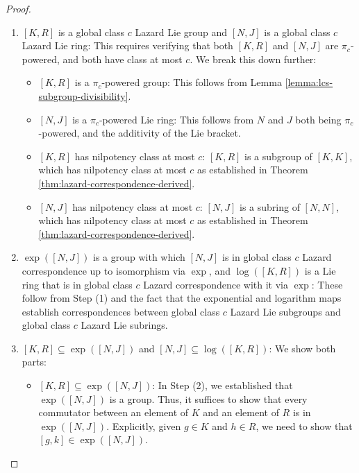 \documentclass{ucetd}
\begin{document}
\begin{proof}
  \begin{enumerate}
  \item $[K,R]$ is a global class $c$ Lazard Lie group and $[N,J]$ is a
    global class $c$ Lazard Lie ring: This requires verifying that
    both $[K,R]$ and $[N,J]$ are $\pi_c$-powered, and both have class
    at most $c$. We break this down further:

    \begin{itemize}
    \item $[K,R]$ is a $\pi_c$-powered group: This follows from Lemma
      \ref{lemma:lcs-subgroup-divisibility}.
    \item $[N,J]$ is a $\pi_c$-powered Lie ring: This follows from $N$
      and $J$ both being $\pi_c$-powered, and the additivity of the
      Lie bracket.
    \item $[K,R]$ has nilpotency class at most $c$: $[K,R]$ is a
      subgroup of $[K,K]$, which has nilpotency class at most $c$ as
      established in Theorem \ref{thm:lazard-correspondence-derived}.
    \item $[N,J]$ has nilpotency class at most $c$: $[N,J]$ is a
      subring of $[N,N]$, which has nilpotency class at most $c$ as
      established in Theorem \ref{thm:lazard-correspondence-derived}.
    \end{itemize}

  \item $\exp([N,J])$ is a group with which $[N,J]$ is in global
    class $c$ Lazard correspondence up to isomorphism via $\exp$, and
    $\log([K,R])$ is a Lie ring that is in global class $c$ Lazard
    correspondence with it via $\exp$: These follow from Step (1) and
    the fact that the exponential and logarithm maps establish
    correspondences between global class $c$ Lazard Lie subgroups and
    global class $c$ Lazard Lie subrings.

  \item $[K,R] \subseteq \exp([N,J])$ and $[N,J] \subseteq
    \log([K,R])$: We show both parts:

    \begin{itemize}
    \item $[K,R] \subseteq \exp([N,J])$: In Step (2), we established
      that $\exp([N,J])$ is a group. Thus, it suffices to show that
      every commutator between an element of $K$ and an element of $R$
      is in $\exp([N,J])$. Explicitly, given $g \in K$ and $h \in R$,
      we need to show that $[g,k] \in \exp([N,J])$. 


\end{itemize}
\end{enumerate}
\end{proof}
\end{document}
